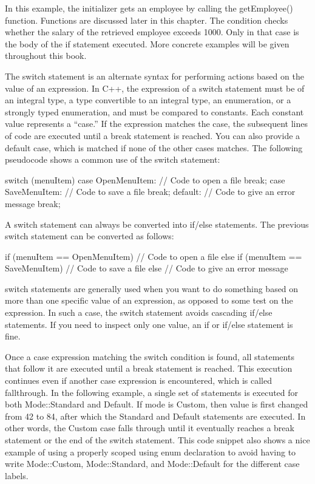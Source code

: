 In this example, the initializer gets an employee by calling the getEmployee() function. Functions are discussed later in this chapter. The condition checks whether the salary of the retrieved employee exceeds 1000. Only in that case is the body of the if statement executed. More concrete examples will be given throughout this book.


The switch statement is an alternate syntax for performing actions based on the value of an expression. In C++, the expression of a switch statement must be of an integral type, a type convertible to an integral type, an enumeration, or a strongly typed enumeration, and must be compared to constants. Each constant value represents a “case.” If the expression matches the case, the subsequent lines of code are executed until a break statement is reached. You can also provide a default case, which is matched if none of the other cases matches. The following pseudocode shows a common use of the switch statement:

\begin{cpp}
switch (menuItem) {
    case OpenMenuItem:
        // Code to open a file
        break;
    case SaveMenuItem:
        // Code to save a file
        break;
    default:
        // Code to give an error message
        break;
}
\end{cpp}

A switch statement can always be converted into if/else statements. The previous switch statement can be converted as follows:

\begin{cpp}
if (menuItem == OpenMenuItem) {
    // Code to open a file
} else if (menuItem == SaveMenuItem) {
    // Code to save a file
} else {
    // Code to give an error message
}
\end{cpp}

switch statements are generally used when you want to do something based on more than one specific value of an expression, as opposed to some test on the expression. In such a case, the switch statement avoids cascading if/else statements. If you need to inspect only one value, an if or if/else statement is fine.

Once a case expression matching the switch condition is found, all statements that follow it are executed until a break statement is reached. This execution continues even if another case expression is encountered, which is called fallthrough. In the following example, a single set of statements is executed for both Mode::Standard and Default. If mode is Custom, then value is first changed from 42 to 84, after which the Standard and Default statements are executed. In other words, the Custom case falls through until it eventually reaches a break statement or the end of the switch statement. This code snippet also shows a nice example of using a properly scoped using enum declaration to avoid having to write Mode::Custom, Mode::Standard, and Mode::Default for the different case labels.

